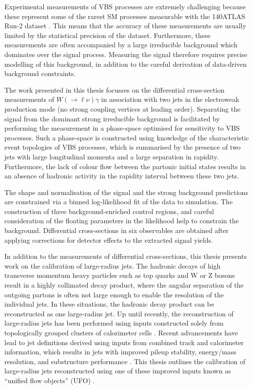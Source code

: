 Experimental measurements of VBS processes are extremely challenging because these represent some of the rarest SM processes measurable with the 140\invfb ATLAS Run-2 dataset \cite{Theory:AtlasSummary}. This means that the accuracy of these measurements are usually limited by the statistical precision of the dataset. Furthermore, these measurements are often accompanied by a large irreducible background which dominates over the signal process. Measuring the signal therefore requires precise modelling of this background, in addition to the careful derivation of data-driven background constraints.

The work presented in this thesis focusses on the differential cross-section measurements of $W(\rightarrow\ell\nu)\gamma$ in association with two jets in the electroweak production mode (no strong coupling vertices at leading order).  Separating the signal from the dominant strong irreducible background is facilitated by performing the measurement in a phase-space optimised for sensitivity to VBS processes. Such a phase-space is constructed using knowledge of the characteristic event topologies of VBS processes, which is summarised by the presence of two jets with large longitudinal momenta and a large separation in rapidity. Furthermore, the lack of colour flow between the partonic initial states results in an absence of hadronic activity in the rapidity interval between these two jets. 

The shape and normalisation of the signal and the strong background predictions are constrained via a binned log-likelihood fit of the data to simulation. The construction of three background-enriched control regions, and careful consideration of the floating parameters in the likelihood help to constrain the background. Differential cross-sections in six observables are obtained after applying corrections for detector effects to the extracted signal yields. 

In addition to the measurements of differential cross-sections, this thesis presents work on the calibration of large-radius jets. The hadronic decays of high transverse momentum heavy particles such as top quarks and W or Z bosons result in a highly collimated decay product, where the angular separation of the outgoing partons is often not large enough to enable the resolution of the individual jets. In these situations, the hadronic decay product can be reconstructed as one large-radius jet. Up until recently, the reconstruction of large-radius jets has been performed using inputs constructed solely from topologically grouped clusters of calorimeter cells \cite{Atlas:largercali,Schramm:2017frb}. Recent advancements have lead to jet definitions derived using inputs from combined track and calorimeter information, which results in jets with improved pileup stability, energy/mass resolution, and substructure performance \cite{Atlas:PFlow,Atlas:TCC,Atlas:UFO}. This thesis outlines the calibration of large-radius jets reconstructed using one of these improved inputs known as ``unified flow objects'' (UFO) \cite{Atlas:UFO}.  %

